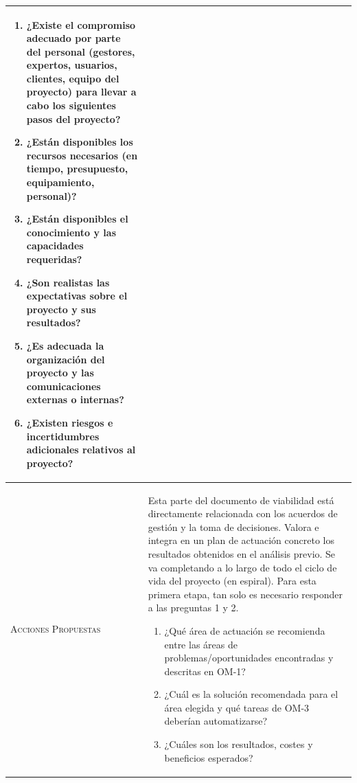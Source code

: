 \documentclass[12pt,a4paper,twoside,spanish]{article}      %
\begin{document}
\begin{table}[H]
\begin{tabularx}{\textwidth}{|l|X|}
                \begin{enumerate}
                    \item ¿Existe el compromiso adecuado por parte del personal (gestores, expertos, usuarios, clientes, equipo del proyecto) para llevar a cabo los siguientes pasos del proyecto?
                    
                    \item ¿Están disponibles los recursos necesarios (en tiempo, presupuesto, equipamiento, personal)?
                    
                    \item ¿Están disponibles el conocimiento y las capacidades requeridas?
                    
                    \item ¿Son realistas las expectativas sobre el proyecto y sus resultados?
                    
                    \item ¿Es adecuada la organización del proyecto y las comunicaciones externas o internas?
                    
                    \item ¿Existen riesgos e incertidumbres adicionales relativos al proyecto?
                \end{enumerate}
                
                \\ \hline
                \textsc{Acciones Propuestas} & Esta parte del documento de viabilidad está directamente relacionada con los acuerdos de gestión y la toma de decisiones. Valora e integra en un plan de actuación concreto los resultados obtenidos en el análisis previo. Se va completando a lo largo de todo el ciclo de vida del proyecto (en espiral). Para esta primera etapa, tan solo es necesario responder a las preguntas 1 y 2.
                
                \begin{enumerate}
                    \item ¿Qué área de actuación se recomienda entre las áreas de problemas/oportunidades encontradas y descritas en OM-1?
                    
                    \item ¿Cuál es la solución recomendada para el área elegida y qué tareas de OM-3 deberían automatizarse?
                    
                    \item ¿Cuáles son los resultados, costes y beneficios esperados?
                    

\end{enumerate}
\end{tabularx}
\end{table}
\end{document}
